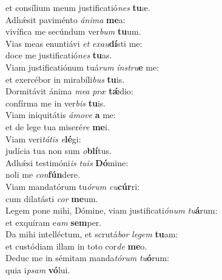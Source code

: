 \evenverse et consílium meum justificatió\textit{nes} \textbf{tu}æ.\\
\oddverse Adhǽsit paviménto \textit{á}\textit{ni}\textit{ma} \textbf{me}a:~\*\\
\oddverse vivífica me secúndum ver\textit{bum} \textbf{tu}um.\\
\evenverse Vias meas enuntiávi \textit{et} \textit{e}\textit{xau}\textbf{dí}sti me:~\*\\
\evenverse doce me justificatió\textit{nes} \textbf{tu}as.\\
\oddverse Viam justificatiónum tuá\textit{rum} \textit{ín}\textit{stru}\textbf{e} me:~\*\\
\oddverse et exercébor in mirabíli\textit{bus} \textbf{tu}is.\\
\evenverse Dormitávit ánima \textit{me}\textit{a} \textit{præ} \textbf{tǽ}dio:~\*\\
\evenverse confírma me in ver\textit{bis} \textbf{tu}is.\\
\oddverse Viam iniquitátis \textit{á}\textit{mo}\textit{ve} \textbf{a} me:~\*\\
\oddverse et de lege tua miseré\textit{re} \textbf{me}i.\\
\evenverse Viam veri\textit{tá}\textit{tis} \textit{e}\textbf{lé}gi:~\*\\
\evenverse judícia tua non sum \textit{o}\textbf{blí}tus.\\
\oddverse Adhǽsi testimóni\textit{is} \textit{tu}\textit{is} \textbf{Dó}mine:~\*\\
\oddverse noli me \textit{con}\textbf{fún}dere.\\
\evenverse Viam mandatórum tu\textit{ó}\textit{rum} \textit{cu}\textbf{cúr}ri:~\*\\
\evenverse cum dilatásti \textit{cor} \textbf{me}um.\\
\oddverse Legem pone mihi, Dómine, viam justificati\textit{ó}\textit{num} \textit{tu}\textbf{á}rum:~\*\\
\oddverse et exquíram e\textit{am} \textbf{sem}per.\\
\evenverse Da mihi intelléctum, et scrutá\textit{bor} \textit{le}\textit{gem} \textbf{tu}am:~\*\\
\evenverse et custódiam illam in toto cor\textit{de} \textbf{me}o.\\
\oddverse Deduc me in sémitam manda\textit{tó}\textit{rum} \textit{tu}\textbf{ó}rum:~\*\\
\oddverse quia i\textit{psam} \textbf{vó}lui.\\
